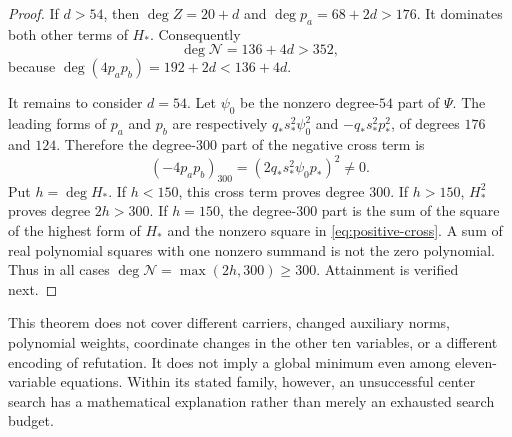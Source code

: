 \begin{proof}
If $d>54$, then $\deg Z=20+d$ and $\deg p_a=68+2d>176$.
It dominates both other terms of $H_*$. Consequently
\[
 \deg\mathcal N=136+4d>352,
\]
because $\deg(4p_ap_b)=192+2d<136+4d$.

It remains to consider $d=54$. Let $\psi_0$ be the nonzero degree-$54$
part of $\Psi$. The leading forms of $p_a$ and $p_b$ are respectively
$q_*s_*^2\psi_0^2$ and $-q_*s_*^2p_*^2$, of degrees $176$ and $124$.
Therefore the degree-$300$ part of the negative cross term is
\begin{equation}\label{eq:positive-cross}
 (-4p_ap_b)_{300}=(2q_*s_*^2\psi_0p_*)^2\ne0.
\end{equation}
Put $h=\deg H_*$. If $h<150$, this cross term proves degree $300$.
If $h>150$, $H_*^2$ proves degree $2h>300$. If $h=150$, the degree-$300$
part is the sum of the square of the highest form of $H_*$ and the nonzero
square in \eqref{eq:positive-cross}. A sum of real polynomial squares with
one nonzero summand is not the zero polynomial. Thus in all cases
$\deg\mathcal N=\max(2h,300)\ge300$. Attainment is verified next.
\end{proof}
This theorem does not cover different carriers, changed auxiliary norms,
polynomial weights, coordinate changes in the other ten variables, or a
different encoding of refutation. It does not imply a global minimum even
among eleven-variable equations. Within its stated family, however, an
unsuccessful center search has a mathematical explanation rather than
merely an exhausted search budget.

